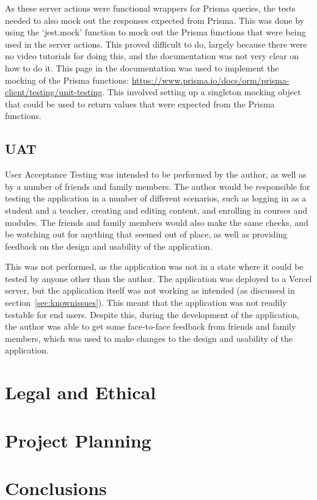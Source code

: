 \documentclass[11pt, a4paper,twoside]{report}
\theoremstyle{plain} %
\theoremstyle{definition} %
\numberwithin{equation}{chapter}
\begin{document}
As these server actions were functional wrappers for Prisma queries, the tests
needed to also mock out the responses expected from Prisma. This was done by
using the `jest.mock' function to mock out the Prisma functions that were being
used in the server actions. This proved difficult to do, largely because there
were no video tutorials for doing this, and the documentation was not very
clear on how to do it. This page in the documentation was used to implement the
mocking of the Prisma functions:
\url{https://www.prisma.io/docs/orm/prisma-client/testing/unit-testing}. This
involved setting up a singleton mocking object that could be used to return
values that were expected from the Prisma functions.

\section{UAT}\label{sec:usertesting}

User Acceptance Testing was intended to be performed by the author, as well as
by a number of friends and family members. The author would be responsible for
testing the application in a number of different scenarios, such as logging in
as a student and a teacher, creating and editing content, and enrolling in
courses and modules. The friends and family members would also make the same
checks, and be watching out for anything that seemed out of place, as well as
providing feedback on the design and usability of the application.

This was not performed, as the application was not in a state where it could be
tested by anyone other than the author. The application was deployed to a
Vercel server, but the application itself was not working as intended (as
discussed in section~\ref{sec:knownissues}). This meant that the application
was not readily testable for end users. Despite this, during the development of
the application, the author was able to get some face-to-face feedback from
friends and family members, which was used to make changes to the design and
usability of the application.

\chapter{Legal and Ethical}\label{ch:legalandethical}


\chapter{Project Planning}\label{ch:projectplanning}


\chapter{Conclusions}\label{ch:conclusion}




\end{document}
